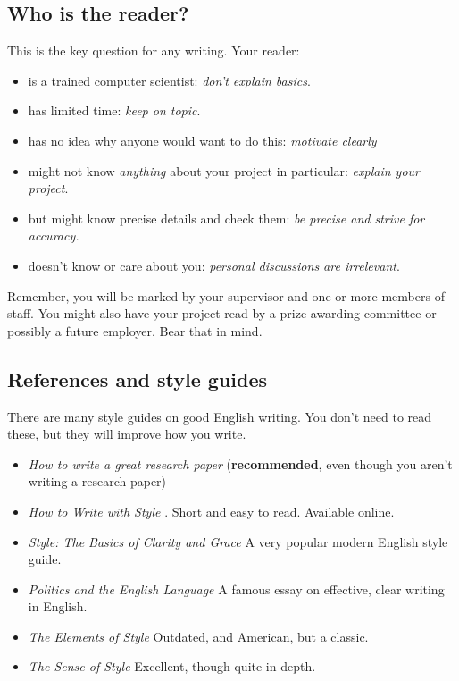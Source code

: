 \documentclass{l4proj}
\begin{document}
\subsection{Who is the reader?}

This is the key question for any writing. Your reader:

\begin{itemize}
    \item
          is a trained computer scientist: \emph{don't explain basics}.
    \item
          has limited time: \emph{keep on topic}.
    \item
          has no idea why anyone would want to do this: \emph{motivate clearly}
    \item
          might not know \emph{anything} about your project in particular:
          \emph{explain your project}.
    \item
          but might know precise details and check them: \emph{be precise and
              strive for accuracy.}
    \item
          doesn't know or care about you: \emph{personal discussions are
              irrelevant}.
\end{itemize}

Remember, you will be marked by your supervisor and one or more members
of staff. You might also have your project read by a prize-awarding
committee or possibly a future employer. Bear that in mind.

\subsection{References and style guides}
There are many style guides on good English writing. You don't need to
read these, but they will improve how you write.

\begin{itemize}
    \item
          \emph{How to write a great research paper} \cite{Pey17} (\textbf{recommended}, even though you aren't writing a research paper)
    \item
          \emph{How to Write with Style} \cite{Von80}. Short and easy to read. Available online.
    \item
          \emph{Style: The Basics of Clarity and Grace} \cite{Wil09} A very popular modern English style guide.
    \item
          \emph{Politics and the English Language} \cite{Orw68}  A famous essay on effective, clear writing in English.
    \item
          \emph{The Elements of Style} \cite{StrWhi07} Outdated, and American, but a classic.
    \item
          \emph{The Sense of Style} \cite{Pin15} Excellent, though quite in-depth.
\end{itemize}
\end{document}
